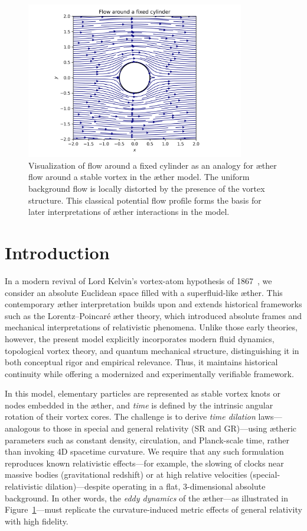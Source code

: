 \begin{figure}[htbp]
    \centering
    \includegraphics[width=0.85\textwidth]{images/02_cylinder_flow}
    \caption{Visualization of flow around a fixed cylinder as an analogy for æther flow around a stable vortex in the æther model. The uniform background flow is locally distorted by the presence of the vortex structure. This classical potential flow profile forms the basis for later interpretations of æther interactions in the model.}
    \label{fig:cylinderflow}
\end{figure}

\section{Introduction}
In a modern revival of Lord Kelvin's vortex-atom hypothesis of 1867~\cite{Kelvin1867-vortex}, we consider an absolute Euclidean space filled with a superfluid-like æther. This contemporary æther interpretation builds upon and extends historical frameworks such as the Lorentz–Poincaré æther theory, which introduced absolute frames and mechanical interpretations of relativistic phenomena. Unlike those early theories, however, the present model explicitly incorporates modern fluid dynamics, topological vortex theory, and quantum mechanical structure, distinguishing it in both conceptual rigor and empirical relevance. Thus, it maintains historical continuity while offering a modernized and experimentally verifiable framework.

In this model, elementary particles are represented as stable vortex knots or nodes embedded in the æther, and \emph{time} is defined by the intrinsic angular rotation of their vortex cores. The challenge is to derive \emph{time dilation} laws—analogous to those in special and general relativity (SR and GR)—using ætheric parameters such as constant density, circulation, and Planck-scale time, rather than invoking 4D spacetime curvature. We require that any such formulation reproduces known relativistic effects—for example, the slowing of clocks near massive bodies (gravitational redshift) or at high relative velocities (special-relativistic dilation)—despite operating in a flat, 3-dimensional absolute background. In other words, the \emph{eddy dynamics} of the æther—as illustrated in Figure~\ref{fig:cylinderflow}—must replicate the curvature-induced metric effects of general relativity with high fidelity.

